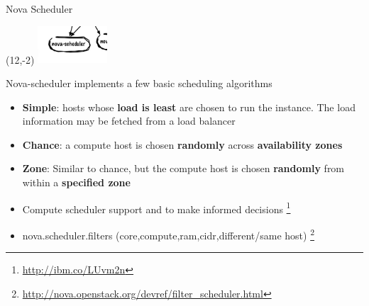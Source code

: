 \begin{frame}{Nova Scheduler}
  \begin{textblock}{}(12,-2)
    \includegraphics[width=7em]{img/nova-scheduler}
  \end{textblock}
  Nova-scheduler implements a few basic scheduling algorithms
  \begin{itemize}
    \item \textbf{Simple}: hosts whose \textbf{load is least} are chosen to run the instance. The load information may be fetched from a load balancer
    \item \textbf{Chance}: a compute host is chosen \textbf{randomly} across \textbf{availability zones}
    \item \textbf{Zone}: Similar to chance, but the compute host is chosen \textbf{randomly} from within a \textbf{specified zone}
  \end{itemize}
  \center
  \footnotesize
  \begin{itemize}
    \item Compute scheduler support  and  to make informed decisions \footnote{\url{http://ibm.co/LUvm2n}}
    \item nova.scheduler.filters (core,compute,ram,cidr,different/same host) \footnote{\url{http://nova.openstack.org/devref/filter\_scheduler.html}}
  \end{itemize}
\end{frame}

